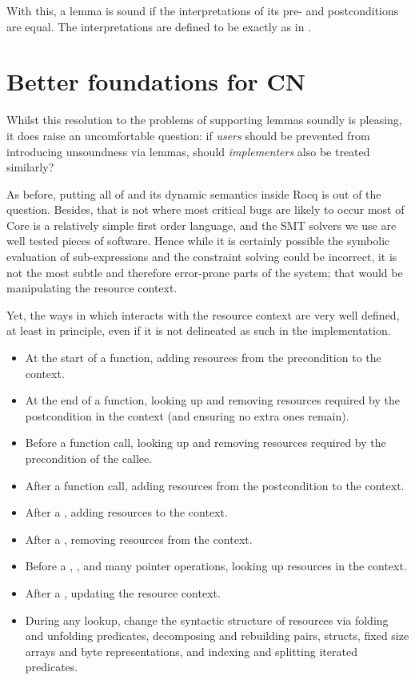With this, a lemma is sound if the interpretations of its pre- and
postconditions are equal. The interpretations are defined to be exactly as in
.

\section{Better foundations for CN}\label{sec:better-foundations}

Whilst this resolution to the problems of supporting lemmas soundly is
pleasing, it does raise an uncomfortable question: if  \emph{users}
should be prevented from introducing unsoundness via lemmas, should 
\emph{implementers} also be treated similarly?

As before, putting all of  and its dynamic semantics inside Rocq is
out of the question. Besides, that is not where most critical bugs are likely
to occur \textemdash{} most of Core is a relatively simple first order
language, and the SMT solvers we use are well tested pieces of software. Hence
while it is certainly possible the symbolic evaluation of sub-expressions and
the constraint solving could be incorrect, it is not the most subtle and
therefore error-prone parts of the system; that would be manipulating the
resource context.

Yet, the ways in which  interacts with the resource context are very
well defined, at least in principle, even if it is not delineated as such in
the implementation.
\begin{itemize}
    \item At the start of a function, adding resources from the precondition to
        the context.
    \item At the end of a function, looking up and removing resources required
        by the postcondition in the context (and ensuring no extra ones remain).
    \item Before a function call, looking up and removing resources required
        by the precondition of the callee.
    \item After a function call, adding resources from the postcondition to the
        context.
    \item After a , adding resources to the context.
    \item After a , removing resources from the context.
    \item Before a , , 
        and many pointer operations, looking up resources in the context.
    \item After a , updating the resource context.
    \item During any lookup, change the syntactic structure of resources via
        folding and unfolding predicates, decomposing and rebuilding pairs,
        structs, fixed size arrays and byte representations, and indexing and
        splitting iterated predicates.
\end{itemize}

